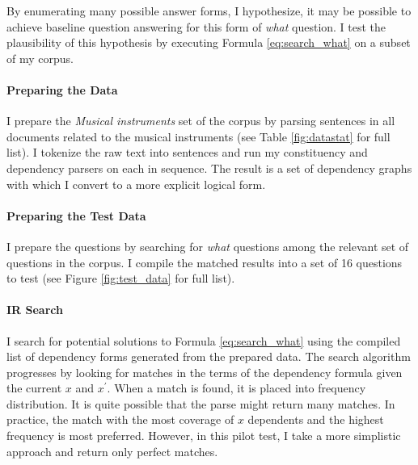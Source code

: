 \documentclass[twoside]{article}
\begin{document}
By enumerating many possible answer forms, I hypothesize, it may be possible to achieve baseline question answering for this form of \textit{what} question.  I test the plausibility of this hypothesis by executing Formula \ref{eq:search_what} on a subset of my corpus.

\paragraph{Preparing the Data}

I prepare the \textit{Musical instruments} set of the corpus by parsing sentences in all documents related to the musical instruments (see Table \ref{fig:datastat} for full list).  I tokenize the raw text into sentences and run my constituency and dependency parsers on each in sequence.  The result is a set of dependency graphs with which I convert to a more explicit logical form.

\paragraph{Preparing the Test Data}

I prepare the questions by searching for \textit{what} questions among the relevant set of questions in the corpus.  I compile the matched results into a set of 16 questions to test (see Figure \ref{fig:test_data} for full list).

\paragraph{IR Search}

I search for potential solutions to Formula \ref{eq:search_what} using the compiled list of dependency forms generated from the prepared data.  The search algorithm progresses by looking for matches in the terms of the dependency formula given the current $x$ and $x^\prime$.  When a match is found, it is placed into frequency distribution.  It is quite possible that the parse might return many matches.  In practice, the match with the most coverage of $x$ dependents and the highest frequency is most preferred.  However, in this pilot test, I take a more simplistic approach and return only perfect matches.
\end{document}

